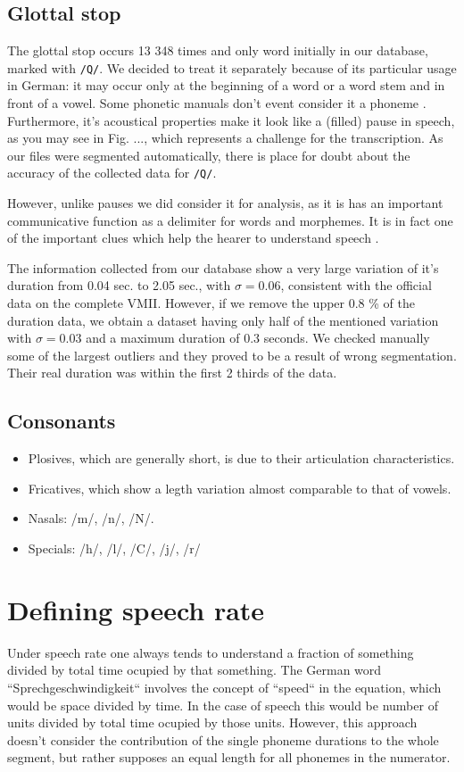\documentclass[a4paper]{scrreprt}
\begin{document}
\section{Glottal stop}
The glottal stop occurs 13 348 times and only word initially in our database, marked with \texttt{/Q/}. We decided to treat it separately because of its particular usage in German: it may occur only at the beginning of a word or a word stem and in front of a vowel. Some phonetic manuals don't event consider it a phoneme \cite{Ternes2012}. Furthermore, it's acoustical properties make it look like a (filled) pause in speech, as you may see in Fig. ..., which represents a challenge for the transcription. As our files were segmented automatically, there is place for doubt about the accuracy of the collected data for \texttt{/Q/}.

However, unlike pauses we did consider it  for analysis, as it is has an important communicative function as a delimiter for words and morphemes. It is in fact one of the important clues which help the hearer to understand speech \cite{Ternes2012}. 

The information collected from our database show a very large variation of it's duration from 0.04 sec. to 2.05 sec., with $\sigma = 0.06$, consistent with the official data on the complete VMII. However, if we remove the upper 0.8 \% of the duration data, we obtain a dataset having only half of the mentioned variation with $\sigma = 0.03$ and a maximum duration of 0.3 seconds. We checked manually some of the largest outliers and they proved to be a result of wrong segmentation. Their real duration was within the first 2 thirds of the data.
\section{Consonants}
\begin{itemize}
	\item Plosives, which are generally short, is due to their articulation characteristics.
	\item Fricatives, which show a legth variation almost comparable to that of vowels.
	\item Nasals: /m/, /n/, /N/.
	\item Specials: /h/, /l/, /C/, /j/, /r/
\end{itemize}


\chapter{Defining speech rate}
Under speech rate one always tends to understand a fraction of something divided by total time ocupied by that something. The German word ``Sprechgeschwindigkeit`` involves the concept of ``speed`` in the equation, which would be space divided by time. In the case of speech this would be number of units divided by total time ocupied by those units. However, this approach doesn't consider the contribution of the single phoneme durations to the whole segment, but rather supposes an equal length for all phonemes in the numerator.
\end{document}
